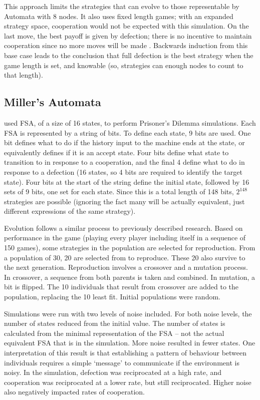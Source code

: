 \documentclass[a4paper,11pt,bcshonoursthesis,singlespace,oneside,thesisdraft,pdflatex]{cssethesis}
\begin{document}
This approach limits the strategies that can evolve to those representable by Automata with 8 nodes. 
It also uses fixed length games; with an expanded strategy space, cooperation would not be expected with this simulation. 
On the last move, the best payoff is given by defection; there is no incentive to maintain cooperation since no more moves will be made \citep{aumann1995backward}. Backwards induction from this base case leads to the conclusion that full defection is the best strategy when the game length is set, and knowable (so, strategies can enough nodes to count to that length). 
\subsection{Miller's Automata}
\citet{miller1996coevolution} used FSA, of a size of 16 states, to perform Prisoner's Dilemma simulations.  
Each FSA is represented by a string of bits. 
To define each state, 9 bits are used. One bit defines what to do if the history input to the machine ends at the state, or equivalently defines if it is an accept state. Four bits define what state to transition to in response to a cooperation, and the final 4 define what to do in response to a defection (16 states, so 4 bits are required to identify the target state). 
Four bits at the start of the string define the initial state, followed by 16 sets of 9 bits, one set for each state. 
Since this is a total length of 148 bits, $2^{148}$ strategies are possible (ignoring the fact many will be actually equivalent, just different expressions of the same strategy). 

Evolution follows a similar process to previously described research. 
Based on performance in the game (playing every player including itself in a sequence of 150 games), some strategies in the population are selected for reproduction. 
From a population of 30, 20 are selected from to reproduce. 
These 20 also survive to the next generation. 
Reproduction involves a crossover and a mutation process. 
In crossover, a sequence from both parents is taken and combined. 
In mutation, a bit is flipped. 
The 10 individuals that result from crossover are added to the population, replacing the 10 least fit. 
Initial populations were random. 

Simulations were run with two levels of noise included.  
For both noise levels, the number of states reduced from the initial value. 
The number of states is calculated from the minimal representation of the FSA -- not the actual equivalent FSA that is in the simulation. 
More noise resulted in fewer states. 
One interpretation of this result is that establishing a pattern of behaviour between individuals requires a simple `message' to communicate if the environment is noisy. 
In the simulation, defection was reciprocated at a high rate, and cooperation was reciprocated at a lower rate, but still reciprocated. 
Higher noise also negatively impacted rates of cooperation. 
\end{document}
